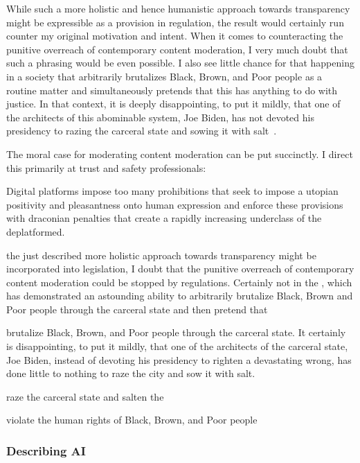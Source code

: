While such a more holistic and hence humanistic approach towards transparency
might be expressible as a provision in regulation, the result would certainly
run counter my original motivation and intent. When it comes to counteracting
the punitive overreach of contemporary content moderation, I very much doubt
that such a phrasing would be even possible. I also see little chance for that
happening in a society that arbitrarily brutalizes Black, Brown, and Poor people
as a routine matter and simultaneously pretends that this has anything to do
with justice. In that context, it is deeply disappointing, to put it mildly,
that one of the architects of this abominable system, Joe Biden, has not devoted
his presidency to razing the carceral state and sowing it with
salt~\cite{Reinhart2022,StolbergHerndon2019}.

The moral case for moderating content moderation can be put succinctly. I direct
this primarily at trust and safety professionals:

Digital platforms impose too many prohibitions that seek to impose a utopian
positivity and pleasantness onto human expression and enforce these provisions
with draconian penalties that create a rapidly increasing underclass of the
deplatformed.


the just described more holistic approach towards transparency might be
incorporated into legislation, I doubt that the punitive overreach of
contemporary content moderation could be stopped by regulations. Certainly not
in the \US, which has demonstrated an astounding ability to arbitrarily
brutalize Black, Brown and Poor people through the carceral state and then
pretend that



brutalize Black, Brown, and Poor people through the carceral state. It certainly
is disappointing, to put it mildly, that one of the architects of the carceral
state, Joe Biden, instead of devoting his presidency to righten a devastating
wrong, has done little to nothing to raze the city and sow it with salt.


raze the carceral state and salten the



violate
the human rights of Black, Brown, and Poor people



\subsubsection{Describing AI}

